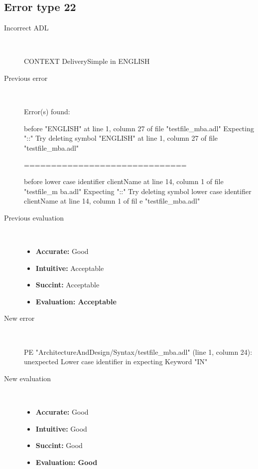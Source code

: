\hrulefill

\subsection{Error type 22}
  \begin{description}
  \item[Incorrect ADL]~\\
\begin{adl}
CONTEXT DeliverySimple in ENGLISH\end{adl}
  \item[Previous error]~\\
\begin{haskell}
Error(s) found:

before "ENGLISH" at line 1, column 27 of file "testfile_mba.adl"
Expecting "::"
Try deleting symbol "ENGLISH" at line 1, column 27 of file "testfile_mba.adl"

==============================

before lower case identifier clientName at line 14, column 1 of file "testfile_m
ba.adl"
Expecting "::"
Try deleting symbol lower case identifier clientName at line 14, column 1 of fil
e "testfile_mba.adl"\end{haskell}
  \item[Previous evaluation]~\\
    \begin{itemize}
    \item \textbf{Accurate:} Good
    \item \textbf{Intuitive:} Acceptable
    \item \textbf{Succint:} Acceptable
    \item \textbf{Evaluation: Acceptable}
    \end{itemize}
  \item[New error]~\\
\begin{haskell}
PE "ArchitectureAndDesign/Syntax/testfile_mba.adl" (line 1, column 24):
unexpected Lower case identifier in
expecting Keyword "IN"\end{haskell}
  \item[New evaluation]~\\
    \begin{itemize}
    \item \textbf{Accurate:} Good
    \item \textbf{Intuitive:} Good
    \item \textbf{Succint:} Good
    \item \textbf{Evaluation: Good
}
    \end{itemize}
  \end{description}


